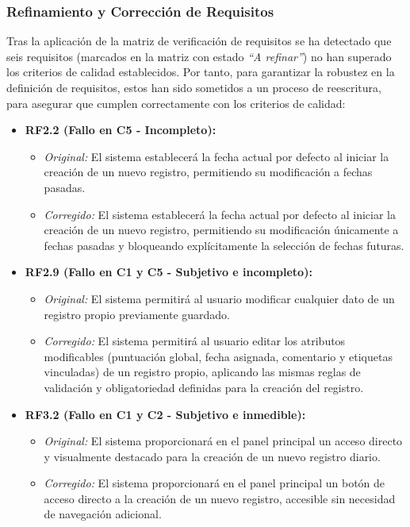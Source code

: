 \subsubsection{Refinamiento y Corrección de Requisitos}

Tras la aplicación de la matriz de verificación de requisitos se ha detectado que seis requisitos (marcados en la matriz con estado \textit{``A refinar''}) no han superado los criterios de calidad establecidos. Por tanto, para garantizar la robustez en la definición de requisitos, estos han sido sometidos a un proceso de reescritura, para asegurar que cumplen correctamente con los criterios de calidad: 


\begin{itemize}
    \item \textbf{RF2.2 (Fallo en C5 - Incompleto):}
    \begin{itemize}
        \item \textit{Original:} El sistema establecerá la fecha actual por defecto al iniciar la creación de un nuevo registro, permitiendo su modificación a fechas pasadas.
        \item \textit{Corregido:} El sistema establecerá la fecha actual por defecto al iniciar la creación de un nuevo registro, permitiendo su modificación únicamente a fechas pasadas y bloqueando explícitamente la selección de fechas futuras.
    \end{itemize}

    \item \textbf{RF2.9 (Fallo en C1 y C5 - Subjetivo e incompleto):}
    \begin{itemize}
        \item \textit{Original:} El sistema permitirá al usuario modificar cualquier dato de un registro propio previamente guardado.
        \item \textit{Corregido:} El sistema permitirá al usuario editar los atributos modificables (puntuación global, fecha asignada, comentario y etiquetas vinculadas) de un registro propio, aplicando las mismas reglas de validación y obligatoriedad definidas para la creación del registro.
    \end{itemize}
    
    \item \textbf{RF3.2 (Fallo en C1 y C2 - Subjetivo e inmedible):}
    \begin{itemize}
        \item \textit{Original:} El sistema proporcionará en el panel principal un acceso directo y visualmente destacado para la creación de un nuevo registro diario.
        \item \textit{Corregido:} El sistema proporcionará en el panel principal un botón de acceso directo a la creación de un nuevo registro, accesible sin necesidad de navegación adicional.
    \end{itemize}


\end{itemize}
